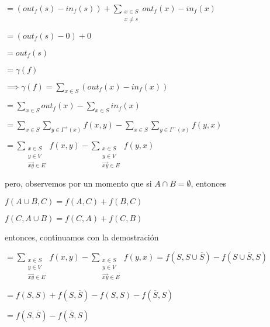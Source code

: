 \documentclass[12pt]{article}
\begin{document}
\(= (out_f(s) - in_f(s)) + \sum_{\substack{x \in S \\ x \ne s}}out_f(x) - in_f(x)\)

\(= (out_f(s) - 0) + 0\)

\(= out_f(s)\)

\(= \gamma(f)\)

\(\implies \gamma(f) = \sum_{x \in S}(out_f(x)-in_f(x))\)

\(= \sum_{x \in S}out_f(x) - \sum_{x \in S}in_f(x)\)

\(= \sum_{x \in S}\sum_{y \in \Gamma^{+}(x)}f(x, y) - \sum_{x \in S}\sum_{y \in \Gamma^{-}(x)}f(y,x)\)

\(= \sum_{\substack{x \in S \\ y \in V \\ \overrightarrow{xy} \in E}}f(x,y) - \sum_{\substack{x \in S \\ y \in V \\ \overrightarrow{xy} \in E}}f(y,x)\)

pero, observemos por un momento que si $A\cap B = \emptyset$, entonces

\(f(A \cup B, C) = f(A,C) + f(B, C)\)

\(f(C, A \cup B) = f(C, A) + f(C, B)\)

entonces, continuamos con la demostración

\(= \sum_{\substack{x \in S \\ y \in V \\ \overrightarrow{xy} \in E}}f(x,y) - \sum_{\substack{x \in S \\ y \in V \\ \overrightarrow{xy} \in E}}f(y,x) = f(S, S \cup \overline{S}) - f(S \cup \overline{S}, S)\)

\(= f(S,S) + f(S, \overline{S}) - f(S, S) - f(\overline{S}, S)\)

\(= f(S, \overline{S}) - f(\overline{S}, S)\)
\end{document}
